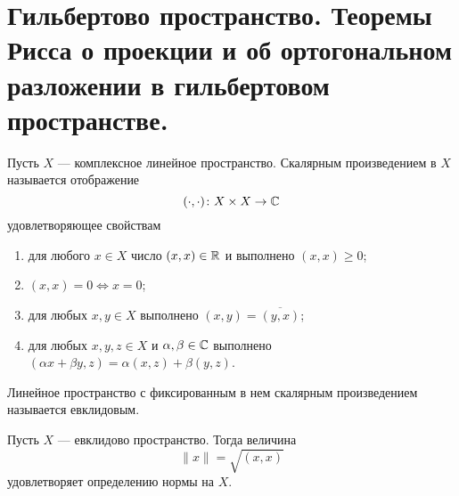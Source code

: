 \newpage
\section{Гильбертово пространство. Теоремы Рисса о проекции и об ортогональном разложении в гильбертовом пространстве.}
\begin{definition}
	Пусть $X$ --- комплексное линейное пространство. Скалярным произведением в $X$ называется отображение 
	$$
	(\cdot, \cdot) \colon X \times X \to \mathbb{C}
	$$
	удовлетворяющее свойствам 
	\begin{enumerate}
		\item для любого $x \in X$ число $(x,x) \in \mathbb{R}$ и выполнено $(x,x) \geq 0$;
		\item $(x,x) = 0 \Leftrightarrow x = 0$;
		\item для любых $x,y \in X$ выполнено $(x,y) = \overline{(y,x)}$;
		\item для любых $x,y,z \in X$ и $\alpha, \beta \in \mathbb{C}$ выполнено $(\alpha x + \beta y, z) = \alpha (x,z) + \beta (y,z)$.
	\end{enumerate}
\end{definition}
\begin{definition}
	Линейное пространство с фиксированным в нем скалярным произведением называется евклидовым. 
\end{definition}
\begin{claim}
	Пусть $X$ --- евклидово пространство. Тогда величина 
	$$
	\|x\| = \sqrt{(x,x)}
	$$
	удовлетворяет определению нормы на $X$.
\end{claim}


